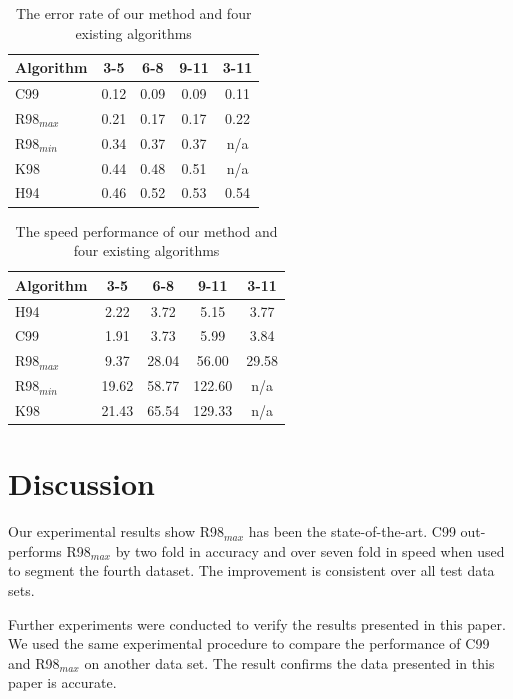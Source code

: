 \documentclass[11pt]{article}
\begin{document}
\begin{table}[ht]
\begin{center}
\begin{tabular}{|l|c|c|c|c|}
\hline
Algorithm & 3-5 & 6-8 & 9-11 & 3-11\\
\hline
C99 & 0.12 & 0.09 & 0.09 & 0.11\\
R98$_{max}$ & 0.21 & 0.17 & 0.17 & 0.22\\
R98$_{min}$ & 0.34 & 0.37 & 0.37 & n/a\\
K98 & 0.44 & 0.48 & 0.51 & n/a\\
H94 & 0.46 & 0.52 & 0.53 & 0.54\\
\hline
\end{tabular}
\end{center}
\caption{The error rate of our method and four existing algorithms}
\label{tbl:accuracy1}
\end{table}


\begin{table}[ht]
\begin{center}
\begin{tabular}{|l|c|c|c|c|}
\hline
Algorithm & 3-5 & 6-8 & 9-11 & 3-11\\
\hline
H94 & 2.22 & 3.72 & 5.15 & 3.77\\
C99 & 1.91 & 3.73 & 5.99 & 3.84\\
R98$_{max}$ & 9.37 & 28.04 & 56.00 & 29.58\\
R98$_{min}$ & 19.62 & 58.77 & 122.60 & n/a\\
K98 & 21.43 & 65.54 & 129.33 & n/a\\
\hline
\end{tabular}
\end{center}
\caption{The speed performance of our method and four existing algorithms}
\label{tbl:speed1}
\end{table}

\section{Discussion}
Our experimental results show R98$_{max}$ has been the state-of-the-art. C99 out-performs R98$_{max}$ by two fold in accuracy and over seven fold in speed when used to segment the fourth dataset. The improvement is consistent over all test data sets.

Further experiments were conducted to verify the results presented in this paper. We used the same experimental procedure to compare the performance of C99 and R98$_{max}$ on another data set. The result confirms the data presented in this paper is accurate.
\end{document}
